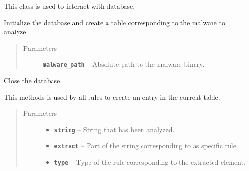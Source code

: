 \documentclass[letterpaper,10pt,oneside]{sphinxmanual}
\begin{document}
\begin{fulllineitems}
\label{index:lib.database.Database}
This class is used to interact with database.

\begin{fulllineitems}
\label{index:lib.database.Database.__init__}
Initialize the database and create a table corresponding to the
malware to analyze.
\begin{quote}\begin{description}
\item[{Parameters}] \leavevmode
\textbf{\texttt{malware\_path}} -- Absolute path to the malware binary.

\end{description}\end{quote}

\end{fulllineitems}


\begin{fulllineitems}
\label{index:lib.database.Database.close}
Close the database.

\end{fulllineitems}


\begin{fulllineitems}
\label{index:lib.database.Database.createEntry}
This methods is used by all rules to create an entry in the current
table.
\begin{quote}\begin{description}
\item[{Parameters}] \leavevmode\begin{itemize}
\item {} 
\textbf{\texttt{string}} -- String that has been analyzed.

\item {} 
\textbf{\texttt{extract}} -- Part of the string corresponding to as specific rule.

\item {} 
\textbf{\texttt{type}} -- Type of the rule corresponding to the extracted element.


\end{itemize}
\end{description}
\end{quote}
\end{fulllineitems}
\end{fulllineitems}
\end{document}
